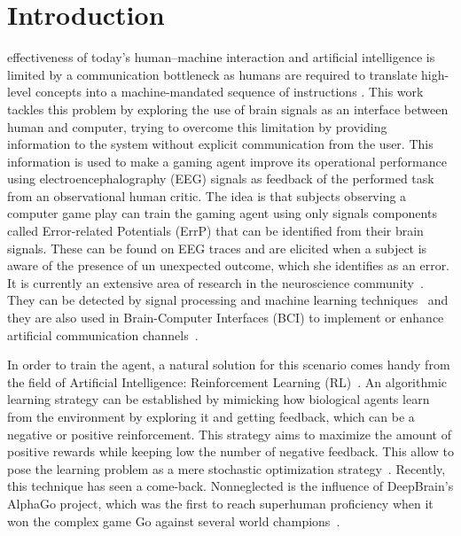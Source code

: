 \documentclass[journal]{IEEEtran}
\begin{document}
%
\IEEEpeerreviewmaketitle



\section{Introduction}


 effectiveness of today's human–machine interaction and artificial intelligence is limited by a communication bottleneck as humans are required to translate high-level concepts into a machine-mandated sequence of instructions \cite{CURSOR-CONTROL-PAPER}.   This work tackles this problem by exploring the use of brain signals as an interface between human and computer, trying to overcome this limitation by providing information to the system without explicit communication from the user.  This information is used to make a gaming agent improve its operational performance using electroencephalography (EEG) signals as feedback of the performed task from an observational human critic. The idea is that subjects observing a computer game play can train the gaming agent using only signals components called Error-related Potentials (ErrP) that can be identified from their brain signals.   These can be found on EEG traces and are elicited when a subject is aware of the presence of un unexpected outcome, which she identifies as an error.  It is currently an extensive area of research in the neuroscience community~\cite{Holroyd2009}.  They can be detected by signal processing and machine learning techniques~\cite{EERP-PAPER} and they are also used in Brain-Computer Interfaces (BCI) to implement or enhance artificial communication channels~\cite{Chavarriaga2014}.

In order to train the agent, a natural solution for this scenario comes handy from the field of Artificial Intelligence: Reinforcement Learning (RL)~\cite{Santos1999}.  An algorithmic learning strategy can be established by mimicking how biological agents learn from the environment by exploring it and getting feedback, which can be a negative or positive reinforcement.  This strategy aims to maximize the amount of positive rewards while keeping low the number of negative feedback.  This allow to pose the learning problem as a mere stochastic optimization strategy~\cite{sutton2018reinforcement}.  Recently, this technique has seen a come-back. Nonneglected is the influence of DeepBrain's AlphaGo project, which was the first to reach superhuman proficiency when it won the complex game Go against several world champions~\cite{ALPHA-GO}.
\end{document}
